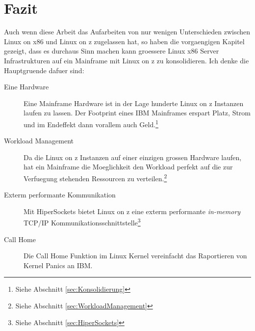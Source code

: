 \chapter{Fazit}
\label{cha:Schluss}

Auch wenn diese Arbeit das Aufarbeiten von nur wenigen Unterschieden zwischen Linux on x86 und Linux on z zugelassen hat, so haben die vorgaengigen Kapitel gezeigt, dass es durchaus Sinn machen kann groessere Linux x86 Server Infrastrukturen auf ein Mainframe mit Linux on z zu konsolidieren.
Ich denke die Hauptgruende dafuer sind:
\begin{description}
    \item[Eine Hardware]{Eine Mainframe Hardware ist in der Lage hunderte Linux on z Instanzen laufen zu lassen. Der Footprint eines IBM Mainframes erspart Platz, Strom und im Endeffekt dann vorallem auch Geld.\footnote{Siehe Abschnitt \ref{sec:Konsolidierung}}}
    \item[Workload Management]{Da die Linux on z Instanzen auf einer einzigen grossen Hardware laufen, hat ein Mainframe die Moeglichkeit den Workload perfekt auf die zur Verfuegung stehenden Ressourcen zu verteilen.\footnote{Siehe Abschnitt \ref{sec:WorkloadManagement}}}
    \item[Exterm performante Kommunikation]{Mit HiperSockets bietet Linux on z eine exterm performante \textit{in-memory} TCP/IP Kommunikationsschnittstelle\footnote{Siehe Abschnitt \ref{sec:HiperSockets}}}
    \item[Call Home]{Die Call Home Funktion im Linux Kernel vereinfacht das Raportieren von Kernel Panics an IBM.}
\end{description}

